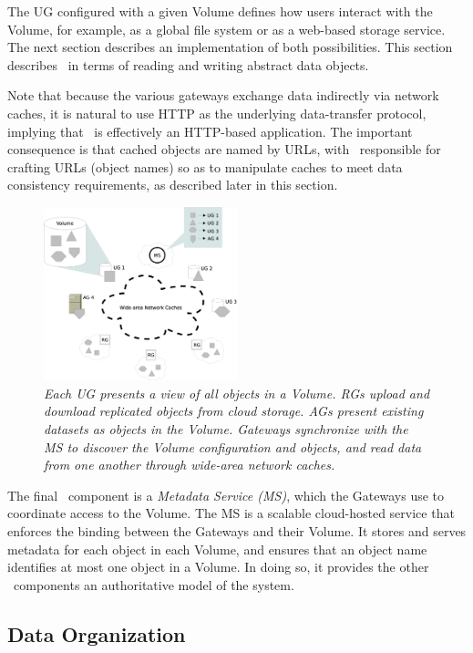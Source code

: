 \noindent The UG configured with a given Volume defines how users interact with the Volume, for example, as a global file system or as a web-based storage service. The next section describes an implementation of both possibilities. This section describes \Syndicate\ in terms of reading and writing abstract data objects.

Note that because the various gateways exchange data indirectly via network caches, it is natural to use HTTP as the underlying data-transfer protocol, implying that \Syndicate\ is effectively an HTTP-based application. The important consequence is that cached objects are named by URLs, with \Syndicate\ responsible for crafting URLs (object names) so as to manipulate caches to meet data consistency requirements, as described later in this section.

\begin{figure}[h!]
\centering
\includegraphics[width=0.5\textwidth]{figures/components}
\caption{\it Each UG presents a view of all objects in a Volume.  RGs upload and download replicated objects from cloud storage.  AGs present existing datasets as objects in the Volume.  Gateways synchronize with the MS to discover the Volume configuration and objects, and read data from one another through wide-area network caches.}
\label{fig:architecture}
\end{figure}

The final \Syndicate\ component is a {\it Metadata Service (MS)}, which the Gateways use to coordinate access to the Volume. The MS is a scalable cloud-hosted service that enforces the binding between the Gateways and their Volume. It stores and serves metadata for each object in each Volume, and ensures that an object name identifies at most one object in a Volume. In doing so, it provides the other \Syndicate\ components an authoritative model of the system.

\subsection{Data Organization}

